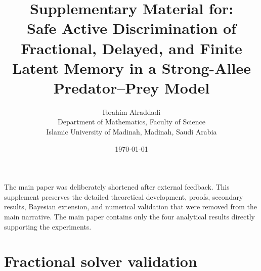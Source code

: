\documentclass[9pt]{extarticle}
\title{Supplementary Material for:\\
Safe Active Discrimination of Fractional, Delayed, and Finite Latent Memory in a Strong-Allee Predator--Prey Model}
\author{Ibrahim Alraddadi\\Department of Mathematics, Faculty of Science\\Islamic University of Madinah, Madinah, Saudi Arabia}
\date{\today}
\begin{document}
\maketitle

\noindent The main paper was deliberately shortened after external feedback. This supplement preserves the detailed theoretical development, proofs, secondary results, Bayesian extension, and numerical validation that were removed from the main narrative. The main paper contains only the four analytical results directly supporting the experiments.

\theoremstyle{plain}
\newtheorem{theorem}{Theorem}[section]
\newtheorem{lemma}[theorem]{Lemma}
\newtheorem{corollary}[theorem]{Corollary}
\theoremstyle{definition}
\newtheorem{definition}[theorem]{Definition}
\theoremstyle{remark}
\newtheorem{remark}[theorem]{Remark}











\section{Fractional solver validation}




\end{document}
